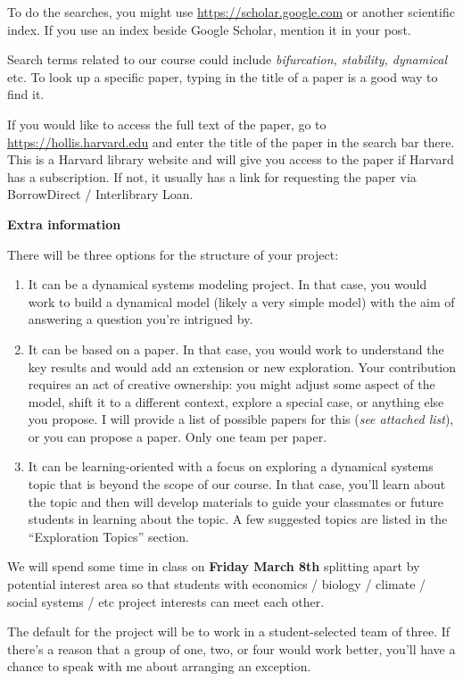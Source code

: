 \documentclass[12pt,letterpaper]{exam}
\begin{document}
\begin{questions}
To do the searches, you might use \url{https://scholar.google.com} or another scientific index.  If you use an index beside Google Scholar, mention it in your post.  

Search terms related to our course could include \emph{bifurcation, stability, dynamical} etc.  To look up a specific paper, typing in the title of a paper is a good way to find it.

If you would like to access the full text of the paper, go to \url{https://hollis.harvard.edu} and enter the title of the paper in the search bar there.  This is a Harvard library website and will give you access to the paper if Harvard has a subscription.  If not, it usually has a link for requesting the paper via BorrowDirect / Interlibrary Loan.

\textbf{Extra information}

There will be three options for the structure of your project:
\begin{enumerate}
    \item It can be a dynamical systems modeling project.  In that case, you would work to build a dynamical model (likely a very simple model) with the aim of answering a question you're intrigued by.
    \item It can be based on a paper.  In that case, you would work to understand the key results and would add an extension or new exploration.  Your contribution requires an act of creative ownership: you might adjust some aspect of the model, shift it to a different context, explore a special case, or anything else you propose.  I will provide a list of possible papers for this (\emph{see attached list}), or you can propose a paper.  Only one team per paper.
    \item It can be learning-oriented with a focus on exploring a dynamical systems topic that is beyond the scope of our course.  In that case, you'll learn about the topic and then will develop materials to guide your classmates or future students in learning about the topic.  A few suggested topics are listed in the ``Exploration Topics'' section.
\end{enumerate}


We will spend some time in class on \textbf{Friday March 8th} splitting apart by potential interest area so that students with economics / biology / climate / social systems / etc project interests can meet each other.


The default for the project will be to work in a student-selected team of three.  If there's a reason that a group of one, two, or four would work better, you'll have a chance to speak with me about arranging an exception. 


\end{questions}
\end{document}
